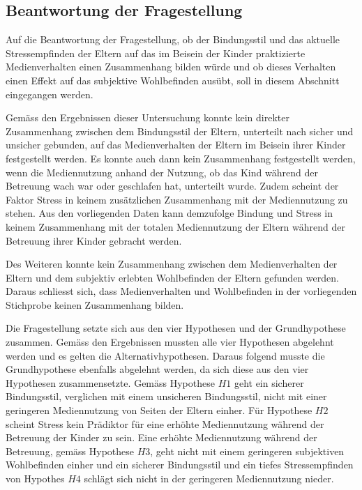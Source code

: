 \subsection{Beantwortung der Fragestellung} \label{sec:BeantwortungFragestellung}
Auf die Beantwortung der Fragestellung, ob der Bindungsstil und das aktuelle Stressempfinden der Eltern auf das im Beisein der Kinder praktizierte Medienverhalten einen Zusammenhang bilden würde und ob dieses Verhalten einen Effekt auf das subjektive Wohlbefinden ausübt, soll in diesem Abschnitt eingegangen werden.

Gemäss den Ergebnissen dieser Untersuchung konnte kein direkter Zusammenhang zwischen dem Bindungsstil der Eltern, unterteilt nach sicher und unsicher gebunden, auf das Medienverhalten der Eltern im Beisein ihrer Kinder festgestellt werden. Es konnte auch dann kein Zusammenhang festgestellt werden, wenn die Mediennutzung anhand der Nutzung, ob das Kind während der Betreuung wach war oder geschlafen hat, unterteilt wurde. Zudem scheint der Faktor Stress in keinem zusätzlichen Zusammenhang mit der Mediennutzung zu stehen. Aus den vorliegenden Daten kann demzufolge Bindung und Stress in keinem Zusammenhang mit der totalen Mediennutzung der Eltern während der Betreuung ihrer Kinder gebracht werden.

Des Weiteren konnte kein Zusammenhang zwischen dem Medienverhalten der Eltern und dem subjektiv erlebten Wohlbefinden der Eltern gefunden werden. Daraus schliesst sich, dass Medienverhalten und Wohlbefinden in der vorliegenden Stichprobe keinen Zusammenhang bilden.

Die Fragestellung setzte sich aus den vier Hypothesen und der Grundhypothese zusammen. Gemäss den Ergebnissen mussten alle vier Hypothesen abgelehnt werden und es gelten die Alternativhypothesen. Daraus folgend musste die Grundhypothese ebenfalls abgelehnt werden, da sich diese aus den vier Hypothesen zusammensetzte. Gemäss Hypothese $H1$ geht ein sicherer Bindungsstil, verglichen mit einem unsicheren Bindungsstil, nicht mit einer geringeren Mediennutzung von Seiten der Eltern einher. Für Hypothese $H2$ scheint Stress kein Prädiktor für eine erhöhte Mediennutzung während der Betreuung der Kinder zu sein. Eine erhöhte Mediennutzung während der Betreuung, gemäss Hypothese $H3$, geht nicht mit einem geringeren subjektiven Wohlbefinden einher und ein sicherer Bindungsstil und ein tiefes Stressempfinden von Hypothes $H4$ schlägt sich nicht in der geringeren Mediennutzung nieder.

